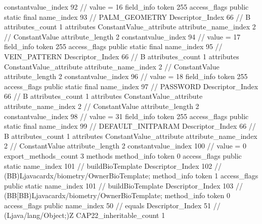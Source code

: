 {{{{{{{					constantvalue_index	92		// value = 16
				}
				}
			}
			field_info {
				token	255
				access_flags	public static final
				name_index	93		// PALM_GEOMETRY
				Descriptor_Index	66		// B
				attributes_count	1
				attributes {
				ConstantValue_attribute {
					attribute_name_index	2		// ConstantValue
					attribute_length	2
					constantvalue_index	94		// value = 17
				}
				}
			}
			field_info {
				token	255
				access_flags	public static final
				name_index	95		// VEIN_PATTERN
				Descriptor_Index	66		// B
				attributes_count	1
				attributes {
				ConstantValue_attribute {
					attribute_name_index	2		// ConstantValue
					attribute_length	2
					constantvalue_index	96		// value = 18
				}
				}
			}
			field_info {
				token	255
				access_flags	public static final
				name_index	97		// PASSWORD
				Descriptor_Index	66		// B
				attributes_count	1
				attributes {
				ConstantValue_attribute {
					attribute_name_index	2		// ConstantValue
					attribute_length	2
					constantvalue_index	98		// value = 31
				}
				}
			}
			field_info {
				token	255
				access_flags	public static final
				name_index	99		// DEFAULT_INITPARAM
				Descriptor_Index	66		// B
				attributes_count	1
				attributes {
				ConstantValue_attribute {
					attribute_name_index	2		// ConstantValue
					attribute_length	2
					constantvalue_index	100		// value = 0
				}
				}
			}
			}
			export_methods_count	3
			methods {
				method_info {
					token	0
					access_flags	public static
					name_index	101		// buildBioTemplate
					Descriptor_Index	102		// (BB)Ljavacardx/biometry/OwnerBioTemplate;
				}
				method_info {
					token	1
					access_flags	public static
					name_index	101		// buildBioTemplate
					Descriptor_Index	103		// (BB[BB)Ljavacardx/biometry/OwnerBioTemplate;
				}
				method_info {
					token	0
					access_flags	public
					name_index	50		// equals
					Descriptor_Index	51		// (Ljava/lang/Object;)Z
				}
			}
			CAP22_inheritable_count	1
		}
	}
}
